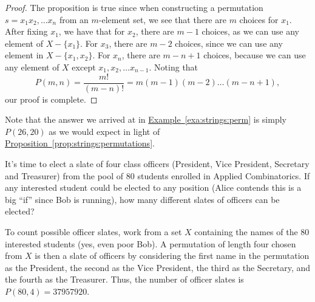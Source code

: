 \begin{proof}
  The proposition is true since when constructing a permutation
  $s=x_1x_2,\dots x_n$ from an $m$-element set, we see that there are
  $m$ choices for $x_1$. After fixing $x_1$, we have that for $x_2$,
  there are $m-1$ choices, as we can use any element of
  $X-\{x_1\}$. For $x_3$, there are $m-2$ choices, since we can use
  any element in $X-\{x_1,x_2\}$. For $x_n$, there are $m-n+1$
  choices, because we can use any element of $X$ except $x_1,x_2,\dots
  x_{n-1}$. Noting that
  \[P(m,n)=\frac{m!}{(m-n)!} = m(m-1)(m-2)\dots(m-n+1),\]
  our proof is complete.
\end{proof}

Note that the answer we arrived at in
\hyperref[exa:strings:perm]{Example~\ref*{exa:strings:perm}} is simply
$P(26,20)$ as we would expect in light of
\hyperref[prop:strings:permutations]{Proposition~\ref*{prop:strings:permutations}}.

\begin{example}\label{exa:strings:officers}
  It's time to elect a slate of four class officers (President,
  Vice President, Secretary and Treasurer) from the pool of $80$
  students enrolled in Applied Combinatorics. 
  If any interested student could be elected to
  any position (Alice contends this is a big ``if'' since Bob is
  running), how many different slates of officers can be elected?

  To count possible officer slates, work from a set $X$ containing the
  names of the $80$ interested students (yes, even poor Bob). A
  permutation of length four chosen from $X$ is then a slate of
  officers by considering the first name in the permutation as the
  President, the second as the Vice President, the third as the
  Secretary, and the fourth as the Treasurer. Thus, the number of
  officer slates is $P(80,4)=37957920$.
\end{example}

